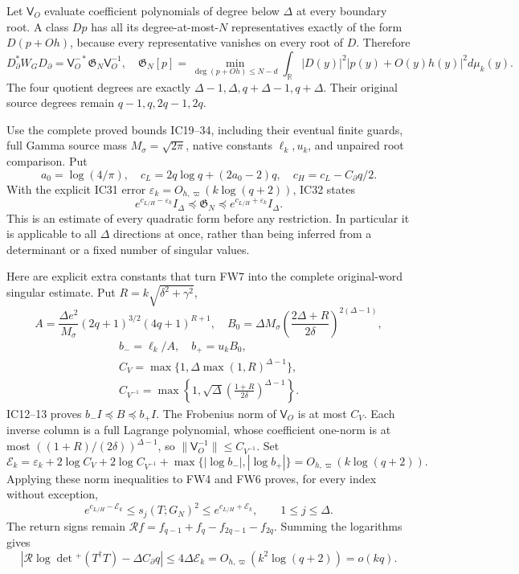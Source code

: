\documentclass[11pt]{article}
\begin{document}
Let \(\mathsf V_O\) evaluate coefficient polynomials of degree below \(\Delta\) at every boundary root. A class \(Dp\) has all its degree-at-most-\(N\) representatives exactly of the form \(D(p+Oh)\), because every representative vanishes on every root of \(D\). Therefore \[
D_\partial^*W_GD_\partial=\mathsf V_O^{-*}\mathfrak G_N\mathsf V_O^{-1},\quad
\mathfrak G_N[p]=\min_{\deg(p+Oh)\le N-d}\int_{\mathbb R}|D(y)|^2|p(y)+O(y)h(y)|^2d\mu_k(y).
\tag{FW6}
\] The four quotient degrees are exactly \(\Delta-1,\Delta,q+\Delta-1,q+\Delta\). Their original source degrees remain \(q-1,q,2q-1,2q\).

Use the complete proved bounds IC19--34, including their eventual finite guards, full Gamma source mass \(M_\sigma=\sqrt{2\pi}\), native constants \(\ell_k,u_k\), and unpaired root comparison. Put \[
a_0=\log(4/\pi),\quad c_L=2q\log q+(2a_0-2)q,\quad
c_H=c_L-C_\partial q/2.
\] With the explicit IC31 error \(\varepsilon_k=O_{h,\varpi}(k\log(q+2))\), IC32 states \[
e^{c_{L/H}-\varepsilon_k}I_\Delta\preceq\mathfrak G_N
\preceq e^{c_{L/H}+\varepsilon_k}I_\Delta.
\tag{FW7}
\] This is an estimate of every quadratic form before any restriction. In particular it is applicable to all \(\Delta\) directions at once, rather than being inferred from a determinant or a fixed number of singular values.

Here are explicit extra constants that turn FW7 into the complete original-word singular estimate. Put \(R=k\sqrt{\delta^2+\gamma^2}\), \[
A=\frac{\Delta e^2}{M_\sigma}(2q+1)^{3/2}(4q+1)^{R+1},\quad
B_0=\Delta M_\sigma\left(\frac{2\Delta+R}{2\delta}\right)^{2(\Delta-1)},
\] \[
\begin{gathered}b_-=\ell_k/A,\quad b_+=u_kB_0,\\
C_V=\max\{1,\Delta\max(1,R)^{\Delta-1}\},\\
C_{V^{-1}}=\max\left\{1,\sqrt\Delta\left(\frac{1+R}{2\delta}\right)^{\Delta-1}\right\}.\end{gathered}
\] IC12--13 proves \(b_-I\preceq B\preceq b_+I\). The Frobenius norm of \(\mathsf V_O\) is at most \(C_V\). Each inverse column is a full Lagrange polynomial, whose coefficient one-norm is at most \(((1+R)/(2\delta))^{\Delta-1}\), so \(\|\mathsf V_O^{-1}\|\le C_{V^{-1}}\). Set \[
\mathcal E_k=\varepsilon_k+2\log C_V+2\log C_{V^{-1}}
+\max\{|\log b_-|,|\log b_+|\}=O_{h,\varpi}(k\log(q+2)).
\tag{FW8}
\] Applying these norm inequalities to FW4 and FW6 proves, for every index without exception, \[
e^{c_{L/H}-\mathcal E_k}\le s_j(T;G_N)^2\le e^{c_{L/H}+\mathcal E_k},
\qquad 1\le j\le\Delta.
\tag{FW9}
\] The return signs remain \(\mathcal Rf=f_{q-1}+f_q-f_{2q-1}-f_{2q}\). Summing the logarithms gives \[
\left|\mathcal R\log\det{}^+(T^{\dagger}T)-\Delta C_\partial q\right|
\le4\Delta\mathcal E_k=O_{h,\varpi}(k^2\log(q+2))=o(kq).
\tag{FW10}
\]
\end{document}
